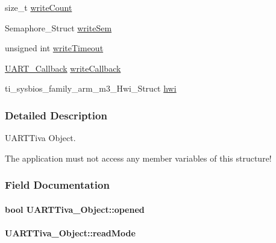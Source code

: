 \begin{DoxyCompactItemize}
\item 
size\+\_\+t \hyperlink{struct_u_a_r_t_tiva___object_ae198d2ae92793acf857c5f2767cf362e}{write\+Count}
\item 
Semaphore\+\_\+\+Struct \hyperlink{struct_u_a_r_t_tiva___object_abae42cf8deae05251566657fef910814}{write\+Sem}
\item 
unsigned int \hyperlink{struct_u_a_r_t_tiva___object_a77456c8d01475337d1e1c0f7bdd7d282}{write\+Timeout}
\item 
\hyperlink{_u_a_r_t_8h_a44620a9d91e0357ebc6f0a79984d9e1e}{U\+A\+R\+T\+\_\+\+Callback} \hyperlink{struct_u_a_r_t_tiva___object_a88eddd60fc1d8a5f215f93650762cd6c}{write\+Callback}
\item 
ti\+\_\+sysbios\+\_\+family\+\_\+arm\+\_\+m3\+\_\+\+Hwi\+\_\+\+Struct \hyperlink{struct_u_a_r_t_tiva___object_aea348826397b66af9bac958c67a96def}{hwi}
\end{DoxyCompactItemize}


\subsubsection{Detailed Description}
U\+A\+R\+T\+Tiva Object. 

The application must not access any member variables of this structure! 

\subsubsection{Field Documentation}
\paragraph[{opened}]{\setlength{\rightskip}{0pt plus 5cm}bool U\+A\+R\+T\+Tiva\+\_\+\+Object\+::opened}\label{struct_u_a_r_t_tiva___object_a1c1768b81cb2710f9c7aed93badf5a80}
\paragraph[{read\+Mode}]{ U\+A\+R\+T\+Tiva\+\_\+\+Object\+::read\+Mode}\label{struct_u_a_r_t_tiva___object_a351089b820c956cafa1fc44f83a6f64b}
